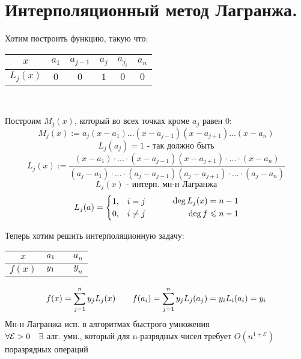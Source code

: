 \documentclass[algebra]{subfiles}
\begin{document}
    \section{Интерполяционный метод Лагранжа.}
      \begin{definition}
        Хотим построить функцию, такую что:
        \begin{center}
          \begin{tabular} {c | c | c c c | c}
            $x$    & $a_1$ & $a_{j - 1} $ & $ a_j$ & $a_{j_i}$ & $a_n$ \\
            \hline
            $L_j(x)$ & $0$   & $0$          & $1$    & $0$       & $0$
          \end{tabular}\\
        \end{center}

        Построим $M_j(x)$, который во всех точках кроме $a_j$ равен 0:
        \[M_j(x) := a_j (x - a_1) ... (x - a_{j - 1}) (x - a_{j + 1})...(x - a_n)\]
        \[L_j(a_j) = 1 \text{ - так должно быть}\]
        \[L_j(x) := \frac{(x - a_1) \cdot ... \cdot (x - a_{j - 1})(x - a_{j + 1}) \cdot ... \cdot (x - a_n)}
          {(a_j - a_1) \cdot ... \cdot (a_j - a_{j - 1})(a_j - a_{j + 1}) \cdot ... \cdot (a_j - a_n)}\]
          \[L_j(x) \text{ - интерп. мн-н Лагранжа}\]
          \[L_j(a) =
            \begin{cases}
              1, & i = j    \\
              0, & i \neq j
            \end{cases}
            \quad\quad\quad
            \begin{align}
              \deg L_j(x) = n - 1 \\
              \deg f \leqslant n - 1
            \end{align}
          \]

          Теперь хотим решить интерполяционную задачу:
          \begin{center}
            \begin{tabular} {c | c  c}
              $x$    & $a_1 \quad$ & $a_n$ \\
              \hline
              $f(x)$ & $y_1 \quad$ & $y_n$
            \end{tabular}
          \end{center}
          \[f(x) = \sum_{j = 1}^n y_j L_j (x) \quad\quad f(a_i) = \sum_{j = 1}^n y_j L_j (a_j) = y_i L_i (a_i) = y_i\]
          Мн-н Лагранжа исп. в алгоритмах быстрого умножения\\
          $\forall \mathcal{E} > 0 \quad \exists $ алг. умн., который для n-разрядных чисел требует $O(n^{1 + \mathcal{E}})$
          поразрядных операций
          \end{definition}
\end{document}

